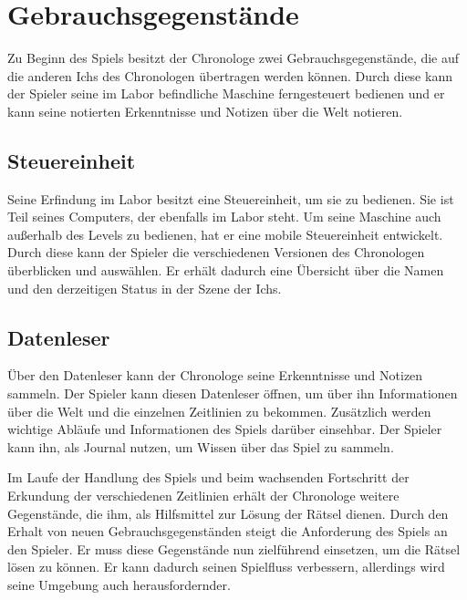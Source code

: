 \section{Gebrauchsgegenstände}
Zu Beginn des Spiels besitzt der Chronologe zwei Gebrauchsgegenstände, die auf die anderen Ichs des Chronologen übertragen werden können. Durch diese kann der Spieler seine im Labor befindliche Maschine ferngesteuert bedienen und er kann seine notierten Erkenntnisse und Notizen über die Welt notieren.

\subsection{Steuereinheit}
Seine Erfindung im Labor besitzt eine Steuereinheit, um sie zu bedienen. Sie ist Teil seines Computers, der ebenfalls im Labor steht. Um seine Maschine auch außerhalb des Levels zu bedienen, hat er eine mobile Steuereinheit entwickelt. Durch diese kann der Spieler die verschiedenen Versionen des Chronologen überblicken und auswählen. Er erhält dadurch eine Übersicht über die Namen und den derzeitigen Status in der Szene der Ichs.

\subsection{Datenleser}\label{sec:concept_datenleser}
Über den Datenleser kann der Chronologe seine Erkenntnisse und Notizen sammeln. Der Spieler kann diesen Datenleser öffnen, um über ihn Informationen über die Welt und die einzelnen Zeitlinien zu bekommen. Zusätzlich werden wichtige Abläufe und Informationen des Spiels darüber einsehbar. Der Spieler kann ihn, als Journal nutzen, um Wissen über das Spiel zu sammeln.

Im Laufe der Handlung des Spiels und beim wachsenden Fortschritt der Erkundung der verschiedenen Zeitlinien erhält der Chronologe weitere Gegenstände, die ihm, als Hilfsmittel zur Lösung der Rätsel dienen. Durch den Erhalt von neuen Gebrauchsgegenständen steigt die Anforderung des Spiels an den Spieler. Er muss diese Gegenstände nun zielführend einsetzen, um die Rätsel lösen zu können. Er kann dadurch seinen Spielfluss verbessern, allerdings wird seine Umgebung auch herausfordernder.

